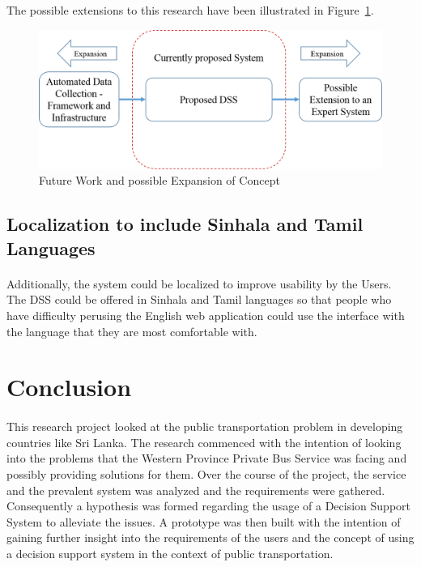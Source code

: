 The possible extensions to this research have been illustrated in Figure~\ref{image-futureWork}.

\begin {figure} [h]
\centering
\includegraphics [scale=0.5] {futureWork}
\caption [Future Work and possible Expansion of Concept] {Future Work and possible Expansion of Concept}
\label {image-futureWork}
\end {figure}

\subsection{Localization to include Sinhala and Tamil Languages}

\paragraph{} Additionally, the system could be localized to improve usability by the Users. The DSS could be offered in Sinhala and Tamil languages so that people who have difficulty perusing the English web application could use the interface with the language that they are most comfortable with.

\section{Conclusion}
\label{section-Conclusion}

\paragraph{} This research project looked at the public transportation problem in developing countries like Sri Lanka. The research commenced with the intention of looking into the problems that the Western Province Private Bus Service was facing and possibly providing solutions for them. Over the course of the project, the service and the prevalent system was analyzed and the requirements were gathered. Consequently a hypothesis was formed regarding the usage of a Decision Support System to alleviate the issues. A prototype was then built with the intention of gaining further insight into the requirements of the users and the concept of using a decision support system in the context of public transportation.

